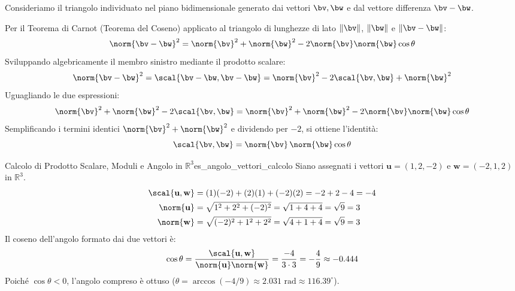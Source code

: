\begin{dimostrazione}
Consideriamo il triangolo individuato nel piano bidimensionale generato dai vettori $\bv, \bw$ e dal vettore differenza $\bv - \bw$.

\begin{center}
\end{center}

Per il Teorema di Carnot (Teorema del Coseno) applicato al triangolo di lunghezze di lato $\|\bv\|$, $\|\bw\|$ e $\|\bv - \bw\|$:
\[
\norm{\bv - \bw}^2 = \norm{\bv}^2 + \norm{\bw}^2 - 2\norm{\bv}\norm{\bw}\cos\theta
\]
Sviluppando algebricamente il membro sinistro mediante il prodotto scalare:
\[
\norm{\bv - \bw}^2 = \scal{\bv - \bw, \bv - \bw} = \norm{\bv}^2 - 2\scal{\bv, \bw} + \norm{\bw}^2
\]
Uguagliando le due espressioni:
\[
\norm{\bv}^2 + \norm{\bw}^2 - 2\scal{\bv, \bw} = \norm{\bv}^2 + \norm{\bw}^2 - 2\norm{\bv}\norm{\bw}\cos\theta
\]
Semplificando i termini identici $\norm{\bv}^2 + \norm{\bw}^2$ e dividendo per $-2$, si ottiene l'identità:
\[
\scal{\bv, \bw} = \norm{\bv} \, \norm{\bw} \cos\theta
\]
\end{dimostrazione}

\begin{esempio}{Calcolo di Prodotto Scalare, Moduli e Angolo in $\mathbb{R}^3$}{es_angolo_vettori_calcolo}
Siano assegnati i vettori $\mathbf{u} = (1, 2, -2)$ e $\mathbf{w} = (-2, 1, 2)$ in $\mathbb{R}^3$.
\begin{align*}
    \scal{\mathbf{u}, \mathbf{w}} &= (1)(-2) + (2)(1) + (-2)(2) = -2 + 2 - 4 = -4 \\
    \norm{\mathbf{u}} &= \sqrt{1^2 + 2^2 + (-2)^2} = \sqrt{1 + 4 + 4} = \sqrt{9} = 3 \\
    \norm{\mathbf{w}} &= \sqrt{(-2)^2 + 1^2 + 2^2} = \sqrt{4 + 1 + 4} = \sqrt{9} = 3
\end{align*}
Il coseno dell'angolo formato dai due vettori è:
\[
\cos\theta = \frac{\scal{\mathbf{u}, \mathbf{w}}}{\norm{\mathbf{u}}\norm{\mathbf{w}}} = \frac{-4}{3 \cdot 3} = -\frac{4}{9} \approx -0.444
\]
Poiché $\cos\theta < 0$, l'angolo compreso è ottuso ($\theta = \arccos(-4/9) \approx 2.031\text{ rad} \approx 116.39^\circ$).
\end{esempio}

